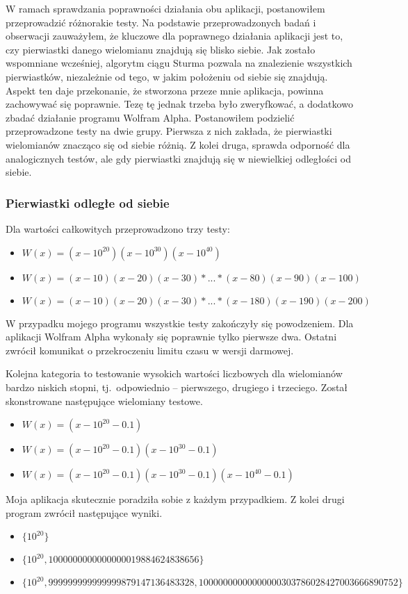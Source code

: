 W ramach sprawdzania poprawności działania obu aplikacji, postanowiłem przeprowadzić różnorakie testy. Na podstawie przeprowadzonych badań i obserwacji zauważyłem, że kluczowe dla poprawnego działania aplikacji jest to, czy pierwiastki danego wielomianu znajdują się blisko siebie. Jak zostało wspomniane wcześniej, algorytm ciągu Sturma pozwala na znalezienie wszystkich pierwiastków, niezależnie od tego, w jakim położeniu od siebie się znajdują. Aspekt ten daje przekonanie, że stworzona przeze mnie aplikacja, powinna zachowywać się poprawnie. Tezę tę jednak trzeba było zweryfkować, a dodatkowo zbadać działanie programu Wolfram Alpha. Postanowiłem podzielić przeprowadzone testy na dwie grupy. Pierwsza z nich zakłada, że pierwiastki wielomianów znacząco się od siebie różnią. Z kolei druga, sprawda odporność dla analogicznych testów, ale gdy pierwiastki znajdują się w niewielkiej odległości od siebie.

\subsubsection {Pierwiastki odległe od siebie}

Dla wartości całkowitych przeprowadzono trzy testy:
\begin{itemize}
	\item $W(x)=(x-10^{20})(x-10^{30})(x-10^{40})$
	\item $W(x)=(x-10)(x-20)(x-30)*...*(x-80)(x-90)(x-100)$
	\item $W(x)=(x-10)(x-20)(x-30)*...*(x-180)(x-190)(x-200)$
\end{itemize}

W przypadku mojego programu wszystkie testy zakończyły się powodzeniem. Dla aplikacji Wolfram Alpha wykonały się poprawnie tylko pierwsze dwa. Ostatni zwrócił komunikat o przekroczeniu limitu czasu w wersji darmowej.

Kolejna kategoria to testowanie wysokich wartości liczbowych dla wielomianów bardzo niskich stopni, tj.\ odpowiednio -- pierwszego, drugiego i trzeciego. Został skonstrowane następujące wielomiany testowe.
\begin{itemize}
	\item $W(x)=(x-10^{20}-0.1)$
	\item $W(x)=(x-10^{20}-0.1)(x-10^{30}-0.1)$
	\item $W(x)=(x-10^{20}-0.1)(x-10^{30}-0.1)(x-10^{40}-0.1)$
\end{itemize}

Moja aplikacja skutecznie poradziła sobie z każdym przypadkiem. Z kolei drugi program zwrócił następujące wyniki.
\begin{itemize}
	\item $\{10^{20}\}$
	\item $\{10^{20}, 1000000000000000019884624838656\}$
	\item $\{10^{20}, 999999999999999879147136483328, 10000000000000000303786028427003666890752\}$
\end{itemize}

